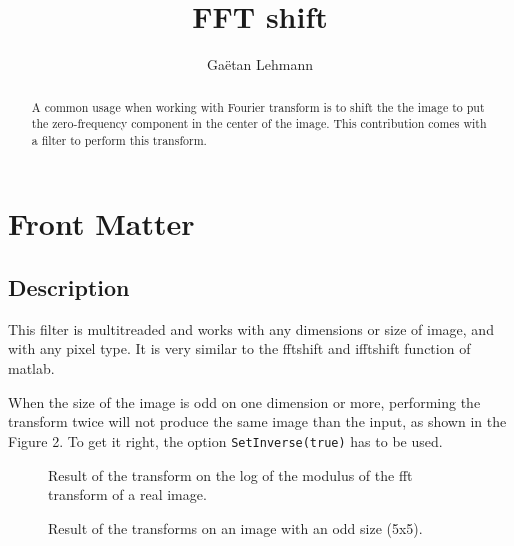 \documentclass{InsightArticle}
\title{FFT shift}
\author{Ga\"etan Lehmann}
\begin{document}
\maketitle

\ifhtml
\chapter*{Front Matter\label{front}}
\fi


\begin{abstract}
\noindent

A common usage when working with Fourier transform is to shift the
the image to put the zero-frequency component in the center of the
image. This contribution comes with a filter to perform this
transform.
\end{abstract}


\section{Description}

This filter is multitreaded and works with any dimensions or size of image, and with any pixel type.
It is very similar to the fftshift and ifftshift function of matlab.

When the size of the image is odd on one dimension or more, performing the
transform twice will not produce the same image than the input, as shown in
the Figure 2. To get it right, the option \verb$SetInverse(true)$ has
to be used.

\begin{figure}[htbp]
\centering
{}
\caption{Result of the transform on the log of the modulus of the fft transform of a real image.}
\end{figure}

\begin{figure}[htbp]
\centering
{}
\subfigure[the image shifted twice, with Inverse = false for the first run, and Inverse = true for the second]{\texttt{[image: 5X5]}}
\caption{Result of the transforms on an image with an odd size (5x5).}
\end{figure}
\end{document}
